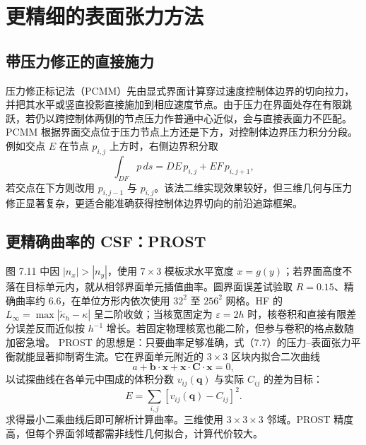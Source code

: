 \documentclass[11pt,a4paper,openany,fontset=none]{ctexbook}
\begin{document}
\section{更精细的表面张力方法}

\subsection{带压力修正的直接施力}

压力修正标记法（PCMM）先由显式界面计算穿过速度控制体边界的切向拉力，并把其水平或竖直投影直接施加到相应速度节点。由于压力在界面处存在有限跳跃，若仍以跨控制体两侧的节点压力作普通中心近似，会与直接表面力不匹配。PCMM 根据界面交点位于压力节点上方还是下方，对控制体边界压力积分分段。例如交点 $E$ 在节点 $p_{i,j}$ 上方时，右侧边界积分取
\begin{equation}
 \int_{DF}p\,ds=DE\,p_{i,j}+EF\,p_{i,j+1},
 \tag{7.72}
\end{equation}
若交点在下方则改用 $p_{i,j-1}$ 与 $p_{i,j}$。该法二维实现效果较好，但三维几何与压力修正显著复杂，更适合能准确获得控制体边界切向的前沿追踪框架。

\subsection{更精确曲率的 CSF：PROST}

图 7.11 中因 $|n_x|>|n_y|$，使用 $7\times3$ 模板求水平宽度 $x=g(y)$；若界面高度不落在目标单元内，就从相邻界面单元插值曲率。圆界面误差试验取 $R=0.15$、精确曲率约 $6.6$，在单位方形内依次使用 $32^2$ 至 $256^2$ 网格。HF 的 $L_\infty=\max|\widetilde\kappa_h-\kappa|$ 呈二阶收敛；当核宽固定为 $\varepsilon=2h$ 时，核卷积和直接有限差分误差反而近似按 $h^{-1}$ 增长。若固定物理核宽也能二阶，但参与卷积的格点数随加密急增。
PROST 的思想是：只要曲率足够准确，式（7.7）的压力--表面张力平衡就能显著抑制寄生流。它在界面单元附近的 $3\times3$ 区块内拟合二次曲线
\begin{equation}
 a+\boldsymbol b\cdot\boldsymbol x
 +\boldsymbol x\cdot\boldsymbol C\cdot\boldsymbol x=0,
 \tag{7.74}
\end{equation}
以试探曲线在各单元中围成的体积分数 $v_{ij}(\boldsymbol q)$ 与实际 $C_{ij}$ 的差为目标：
\begin{equation}
 E=\sum_{i,j}\left[v_{ij}(\boldsymbol q)-C_{ij}\right]^2.
 \tag{7.75}
\end{equation}
求得最小二乘曲线后即可解析计算曲率。三维使用 $3\times3\times3$ 邻域。PROST 精度高，但每个界面邻域都需非线性几何拟合，计算代价较大。
\end{document}
